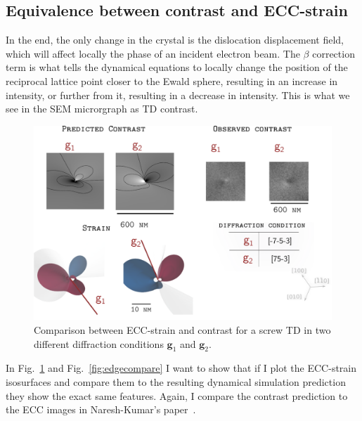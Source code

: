 \subsection{Equivalence between contrast and ECC-strain}

In the end, the only change in the crystal is the dislocation displacement field, which will affect locally the phase of an incident electron beam. The $\beta$ correction term is what tells the dynamical equations to locally change the position of the reciprocal lattice point closer to the Ewald sphere, resulting in an increase in intensity, or further from it, resulting in a decrease in intensity. This is what we see in the SEM microrgraph as TD contrast. 

\begin{figure}[ht]
    \centering
    \includegraphics[width=0.7\linewidth]{Figures/screwcompare.png}
    \caption{ Comparison between ECC-strain and contrast for a screw TD in two different diffraction conditions $\textbf{g}_1$ and $\textbf{g}_2$.}
    \label{fig:screwcompare}
\end{figure}


In Fig.~\ref{fig:screwcompare} and Fig.~\ref{fig:edgecompare} I want to show that if I plot the ECC-strain isosurfaces and compare them to the resulting dynamical simulation prediction they show the exact same features. Again, I compare the contrast prediction to the ECC images in Naresh-Kumar's paper~\cite{Naresh}.




